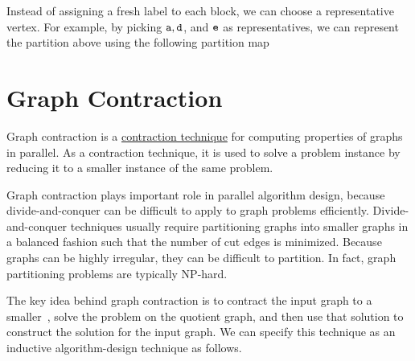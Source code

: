 \begin{flex}
\begin{example}
Instead of assigning a fresh label to each block, we can choose a
representative vertex.
%
For example, by picking $\texttt{a}, \texttt{d}$, and $\texttt{e}$ as
representatives, we can represent the partition above using the
following partition map

\end{example}
\end{flex}

\section{Graph Contraction}
\label{ex:graphcon::intro::graphcon}

Graph contraction is a 
%
\href{ch:design::contraction}{contraction technique}
%
for computing properties of graphs in parallel.
%
As a contraction technique, it is used to solve a problem
instance by reducing it to a smaller instance of the same problem.
%
%

Graph contraction plays important role in parallel algorithm design, because
divide-and-conquer can be difficult to apply to graph problems
efficiently.  
%
Divide-and-conquer techniques usually require partitioning graphs into
smaller graphs in a balanced fashion such that the number of cut edges
is minimized.  
%
Because graphs can be highly irregular, they can be difficult
to partition. 
%
In fact, graph partitioning problems are typically
NP-hard.
%

\begin{gram}
\label{graphcon::intro::graphcon::quotient}
The key idea behind graph contraction is to contract the input graph
to a smaller~, solve the problem on the quotient
graph, and then use that solution to construct the solution for the
input graph.  
%
We can specify this technique as an inductive algorithm-design
technique as follows.
\end{gram}

